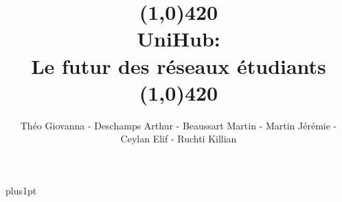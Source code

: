 \documentclass[12pt]{ociamthesis}  %
\title{\line(1,0){420}\\\textbf{U}ni\textbf{H}ub:\\ Le futur des réseaux étudiants\\\line(1,0){420}}   %
\author{Théo Giovanna - Deschamps Arthur - Beaussart Martin - Martin Jérémie - Ceylan Elif - Ruchti Killian}             %
\begin{document}
\def\mathbi#1{\textbf{\em #1}}
\baselineskip=18pt plus1pt

\setcounter{secnumdepth}{3}
\setcounter{tocdepth}{3}


\maketitle                  %

\begin{romanpages}          %
\tableofcontents            %

\end{romanpages}            %


%
%
%
%

%
%

\end{document}
